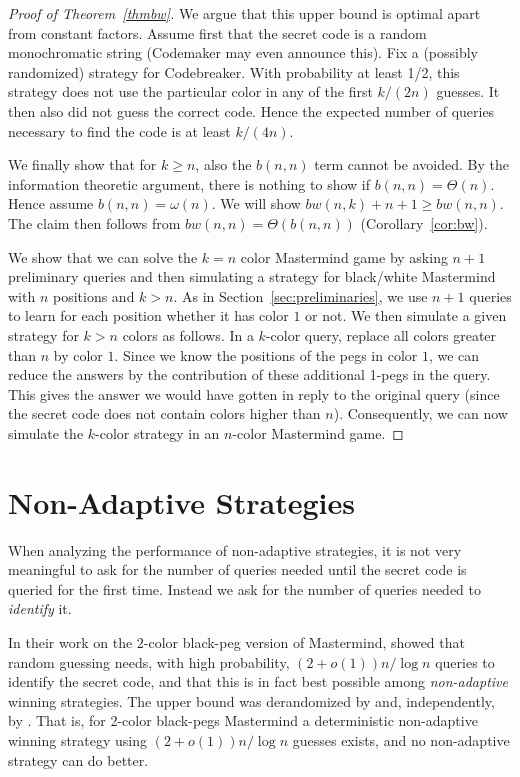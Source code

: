 \documentclass[english,a4paper,11pt]{article}
\newcommand{\ifLongCites}[2]{#1}
\newcommand{\ifLongCites}[2]{#2}
\begin{document}
{\begin{proof}[Proof of Theorem~\ref{thmbw}]
We argue that this upper bound is optimal apart from constant factors. Assume first that the secret code is a random monochromatic string (Codemaker may even announce this). Fix a (possibly randomized) strategy for Codebreaker. With probability at least 1/2, this strategy does not use the particular color in any of the first $k/(2n)$ guesses. It then also did not guess the correct code. Hence the expected number of queries necessary to find the code is at least $k/(4n)$. 

We finally show that for $k \ge n$, also the $b(n,n)$ term cannot be avoided. By the information theoretic argument, there is nothing to show if $b(n,n) = \Theta(n)$. Hence assume $b(n,n) = \omega(n)$. We will show $bw(n,k) + n + 1 \ge bw(n,n)$. The claim then follows from $bw(n,n) = \Theta(b(n,n))$ (Corollary~\ref{cor:bw}).

We show that we can solve the $k=n$ color Mastermind game by asking $n+1$ preliminary queries and then simulating a strategy for black/white Mastermind with $n$ positions and $k > n$. As in Section~\ref{sec:preliminaries}, we use $n+1$ queries to learn for each position whether it has color $1$ or not. We then simulate a given strategy for $k > n$ colors as follows. In a $k$-color query, replace all colors greater than $n$ by color $1$. Since we know the positions of the pegs in color $1$, we can reduce the answers by the contribution of these additional 1-pegs in the query. This gives the answer we would have gotten in reply to the original query (since the secret code does not contain colors higher than $n$). Consequently, we can now simulate the $k$-color strategy in an $n$-color Mastermind game.
\end{proof}


\section{Non-Adaptive Strategies}
\label{sec:nonadaptive} 


When analyzing the performance of non-adaptive strategies, it is not very meaningful to ask for the number of queries needed until the secret code is queried for the first time. 
Instead we ask for the number of queries needed to \emph{identify} it.


In their work on the $2$-color black-peg version of Mastermind, \ifLongCites{\cite{Erd63}}{Erd{\H{o}}s and R\'enyi~\cite{Erd63}} showed that random guessing needs, with high probability, $(2+o(1)) n /\log n$ queries to identify the secret code, and that this is in fact best possible among \emph{non-adaptive} winning strategies. The upper bound was derandomized by \ifLongCites{\cite{Lindstroem64,Lindstroem65}}{Lindstr\"om~\cite{Lindstroem64,Lindstroem65}} and, independently, by \ifLongCites{\cite{CantorM66}}{Cantor and Mills~\cite{CantorM66}}. That is, for 2-color black-pegs Mastermind a deterministic non-adaptive winning strategy using $(2+o(1)) n /\log n$ guesses exists, and no non-adaptive strategy can do better. 

}
\end{document}
